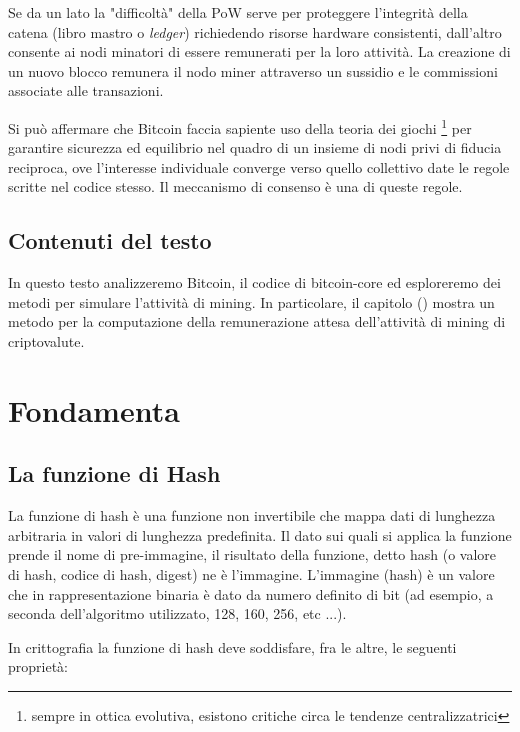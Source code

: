 \documentclass{book}
\theoremstyle{definition}
\begin{document}
Se da un lato la "difficoltà" della PoW serve per proteggere l'integrità della catena (libro mastro o \textit{ledger}) richiedendo risorse hardware consistenti,
dall'altro consente ai nodi minatori di essere remunerati per la loro attività. La creazione di un nuovo blocco remunera il nodo miner attraverso un sussidio e le commissioni associate alle transazioni. 

Si può affermare che Bitcoin faccia sapiente uso della teoria dei giochi \footnote{sempre in ottica evolutiva, esistono critiche circa le tendenze centralizzatrici} per garantire sicurezza ed equilibrio nel quadro di un insieme di nodi privi di fiducia reciproca, ove l'interesse individuale converge verso quello collettivo date le regole scritte nel codice stesso.
Il meccanismo di consenso è una di queste regole.

\subsection{Contenuti del testo}

In questo testo analizzeremo Bitcoin, il codice di bitcoin-core ed esploreremo dei metodi per simulare l'attività di mining.
In particolare, il capitolo () mostra un metodo per la computazione della remunerazione attesa dell'attività di mining di criptovalute.

\newpage
\section{Fondamenta}

\subsection{La funzione di Hash}

La funzione di hash è una funzione non invertibile che mappa dati di lunghezza arbitraria in valori di lunghezza predefinita.
Il dato sui quali si applica la funzione prende il nome di pre-immagine, il risultato della funzione, detto hash (o valore di hash, codice di hash, digest) ne è l'immagine.
L'immagine (hash) è un valore che in rappresentazione binaria è dato da numero definito di bit (ad esempio, a seconda dell'algoritmo utilizzato, 128, 160, 256, etc ...).

In crittografia la funzione di hash deve soddisfare, fra le altre, le seguenti proprietà:
\end{document}
